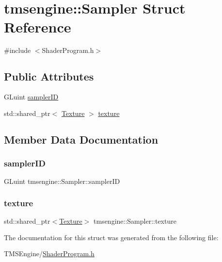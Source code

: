 \hypertarget{structtmsengine_1_1_sampler}{}\section{tmsengine\+:\+:Sampler Struct Reference}
\label{structtmsengine_1_1_sampler}


{\ttfamily \#include $<$Shader\+Program.\+h$>$}

\subsection*{Public Attributes}
\begin{DoxyCompactItemize}
\item 
G\+Luint \hyperlink{structtmsengine_1_1_sampler_a565a09cf1484d33276993fd5c8eaec09}{sampler\+ID}
\item 
std\+::shared\+\_\+ptr$<$ \hyperlink{classtmsengine_1_1_texture}{Texture} $>$ \hyperlink{structtmsengine_1_1_sampler_af8ea8b2d52e4fd2bec956f844ebda8d9}{texture}
\end{DoxyCompactItemize}


\subsection{Member Data Documentation}
\mbox{\label{structtmsengine_1_1_sampler_a565a09cf1484d33276993fd5c8eaec09}} 
\subsubsection{\texorpdfstring{sampler\+ID}{samplerID}}
{\footnotesize\ttfamily G\+Luint tmsengine\+::\+Sampler\+::sampler\+ID}

\mbox{\label{structtmsengine_1_1_sampler_af8ea8b2d52e4fd2bec956f844ebda8d9}} 
\subsubsection{\texorpdfstring{texture}{texture}}
{\footnotesize\ttfamily std\+::shared\+\_\+ptr$<$\hyperlink{classtmsengine_1_1_texture}{Texture}$>$ tmsengine\+::\+Sampler\+::texture}



The documentation for this struct was generated from the following file\+:\begin{DoxyCompactItemize}
\item 
T\+M\+S\+Engine/\hyperlink{_shader_program_8h}{Shader\+Program.\+h}\end{DoxyCompactItemize}
